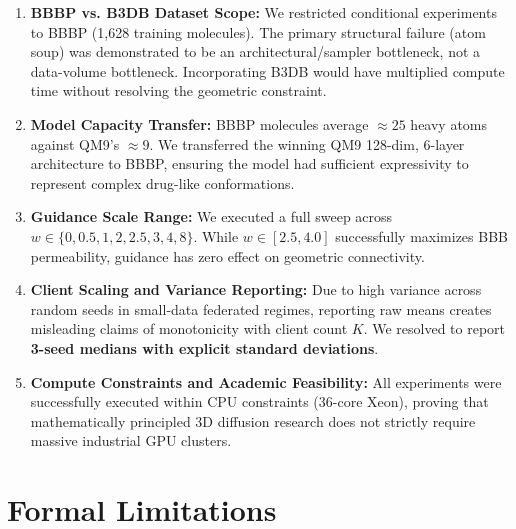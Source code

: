 \documentclass[12pt, a4paper]{article}
\begin{document}
\begin{enumerate}[leftmargin=*]
    \item \textbf{BBBP vs. B3DB Dataset Scope:} We restricted conditional experiments to BBBP (1,628 training molecules). The primary structural failure (atom soup) was demonstrated to be an architectural/sampler bottleneck, not a data-volume bottleneck. Incorporating B3DB would have multiplied compute time without resolving the geometric constraint.
    \item \textbf{Model Capacity Transfer:} BBBP molecules average $\approx 25$ heavy atoms against QM9's $\approx 9$. We transferred the winning QM9 128-dim, 6-layer architecture to BBBP, ensuring the model had sufficient expressivity to represent complex drug-like conformations.
    \item \textbf{Guidance Scale Range:} We executed a full sweep across $w \in \{0, 0.5, 1, 2, 2.5, 3, 4, 8\}$. While $w \in [2.5, 4.0]$ successfully maximizes BBB permeability, guidance has zero effect on geometric connectivity.
    \item \textbf{Client Scaling and Variance Reporting:} Due to high variance across random seeds in small-data federated regimes, reporting raw means creates misleading claims of monotonicity with client count $K$. We resolved to report \textbf{3-seed medians with explicit standard deviations}.
    \item \textbf{Compute Constraints and Academic Feasibility:} All experiments were successfully executed within CPU constraints (36-core Xeon), proving that mathematically principled 3D diffusion research does not strictly require massive industrial GPU clusters.
\end{enumerate}

\section{Formal Limitations}
\label{sec:limitations}
\end{document}
